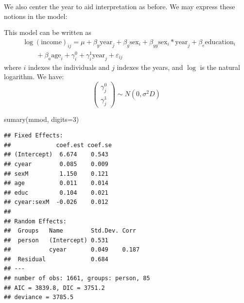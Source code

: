 \documentclass[
  ignorenonframetext,
]{beamer}
\newenvironment{Shaded}{\begin{snugshade}}{\end{snugshade}}
\newcommand{\AttributeTok}[1]{\textcolor[rgb]{0.77,0.63,0.00}{#1}}
\newcommand{\DecValTok}[1]{\textcolor[rgb]{0.00,0.00,0.81}{#1}}
\newcommand{\FunctionTok}[1]{\textcolor[rgb]{0.00,0.00,0.00}{#1}}
\newcommand{\NormalTok}[1]{#1}
\newcommand{\OtherTok}[1]{\textcolor[rgb]{0.56,0.35,0.01}{#1}}
\newcommand{\SpecialCharTok}[1]{\textcolor[rgb]{0.00,0.00,0.00}{#1}}
\begin{document}
\begin{frame}[fragile]{}
\protect\hypertarget{section-26}{}
We also center the year to aid interpretation as before. We may express
these notions in the model:

\vspace{12pt}
\tiny

\begin{Shaded}
\end{Shaded}

\vspace{12pt}
\normalsize

This model can be written as \begin{align*}
  &\log(\text{income})_{ij} = 
    \mu + \beta_y\text{year}_j + \beta_g \text{sex}_i + \beta_{yg}\text{sex}_i*\text{year}_j + \beta_e\text{education}_i \\
    &\qquad+ \beta_a\text{age}_i + \gamma_i^0 + \gamma_i^1 \text{year}_j + \varepsilon_{ij}
\end{align*} where \(i\) indexes the individuals and \(j\) indexes the
years, and \(\log\) is the natural logarithm. We have: \[
\begin{pmatrix}
  \gamma_j^0 \\
  \gamma_j^1
\end{pmatrix} \sim N(0, \sigma^2D)
\]
\end{frame}

\begin{frame}[fragile]{}
\protect\hypertarget{section-27}{}
\small

\begin{Shaded}
\begin{Highlighting}[]
\FunctionTok{sumary}\NormalTok{(mmod, }\AttributeTok{digits=}\DecValTok{3}\NormalTok{)}
\end{Highlighting}
\end{Shaded}

\begin{verbatim}
## Fixed Effects:
##             coef.est coef.se
## (Intercept)  6.674    0.543 
## cyear        0.085    0.009 
## sexM         1.150    0.121 
## age          0.011    0.014 
## educ         0.104    0.021 
## cyear:sexM  -0.026    0.012 
## 
## Random Effects:
##  Groups   Name        Std.Dev. Corr  
##  person   (Intercept) 0.531          
##           cyear       0.049    0.187 
##  Residual             0.684          
## ---
## number of obs: 1661, groups: person, 85
## AIC = 3839.8, DIC = 3751.2
## deviance = 3785.5
\end{verbatim}
\end{frame}
\end{document}
